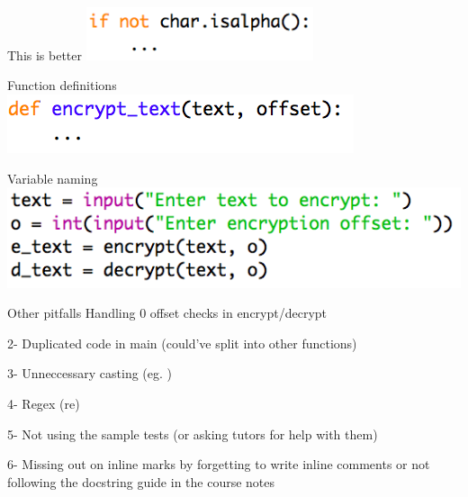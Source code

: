 \documentclass[week2]{csse1001}
\begin{document}
\begin{topic}{This is better}
\includegraphics[width=0.5\textwidth]{a1pitfalls/punctugood}
\end{topic}

\begin{topic}{Function definitions}
\includegraphics[width=\textwidth]{a1pitfalls/fdef}
\end{topic}

\begin{topic}{Variable naming}
\includegraphics[width=\textwidth]{a1pitfalls/vname}
\end{topic}

\begin{topic}{Other pitfalls}
Handling 0 offset checks in encrypt/decrypt

\begin{subtopic}{2-}
Duplicated code in main (could've split into other functions)
\end{subtopic}

\begin{subtopic}{3-}
Unneccessary casting (eg. )
\end{subtopic}

\begin{subtopic}{4-}
Regex (re)
\end{subtopic}

\begin{subtopic}{5-}
Not using the sample tests (or asking tutors for help with them)
\end{subtopic}

\begin{subtopic}{6-}
Missing out on inline marks by forgetting to write inline comments or not following the docstring guide in the course notes
\end{subtopic}

\end{topic}
\end{document}

